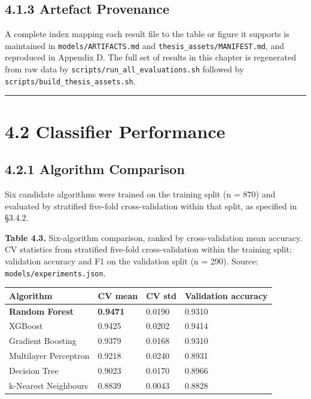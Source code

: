 \hypertarget{artefact-provenance}{%
\subsection{4.1.3 Artefact Provenance}\label{artefact-provenance}}

A complete index mapping each result file to the table or figure it supports is maintained in \texttt{models/ARTIFACTS.md} and \texttt{thesis\_assets/MANIFEST.md}, and reproduced in Appendix D. The full set of results in this chapter is regenerated from raw data by \texttt{scripts/run\_all\_evaluations.sh} followed by \texttt{scripts/build\_thesis\_assets.sh}.

\begin{center}\rule{0.5\linewidth}{0.5pt}\end{center}

\hypertarget{classifier-performance}{%
\section{4.2 Classifier Performance}\label{classifier-performance}}

\hypertarget{algorithm-comparison}{%
\subsection{4.2.1 Algorithm Comparison}\label{algorithm-comparison}}

Six candidate algorithms were trained on the training split (n = 870) and evaluated by stratified five-fold cross-validation within that split, as specified in §3.4.2.

\textbf{Table 4.3.} Six-algorithm comparison, ranked by cross-validation mean accuracy. CV statistics from stratified five-fold cross-validation within the training split; validation accuracy and F1 on the validation split (n = 290). Source: \texttt{models/experiments.json}.

\begin{longtable}[]{@{}llll@{}}
\toprule\noalign{}
Algorithm & CV mean & CV std & Validation accuracy \\
\midrule\noalign{}
\endhead
\bottomrule\noalign{}
\endlastfoot
\textbf{Random Forest} & \textbf{0.9471} & 0.0190 & 0.9310 \\
XGBoost & 0.9425 & 0.0202 & 0.9414 \\
Gradient Boosting & 0.9379 & 0.0168 & 0.9310 \\
Multilayer Perceptron & 0.9218 & 0.0240 & 0.8931 \\
Decision Tree & 0.9023 & 0.0170 & 0.8966 \\
k-Nearest Neighbours & 0.8839 & 0.0043 & 0.8828 \\
\end{longtable}

